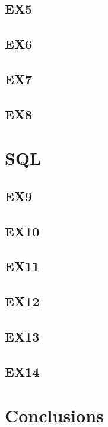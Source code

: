 \documentclass[a4paper]{article}
\begin{document}
\subsection{EX5}
\subsection{EX6}
\subsection{EX7}
\subsection{EX8}

\section{SQL}
\subsection{EX9}
\subsection{EX10}
\subsection{EX11}
\subsection{EX12}
\subsection{EX13}
\subsection{EX14}

\section{Conclusions}
\end{document}
